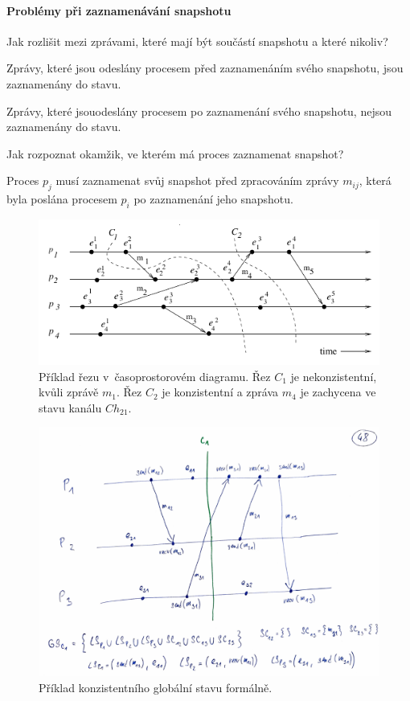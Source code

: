 \paragraph*{Problémy při zaznamenávání snapshotu} Jak rozlišit mezi zprávami, které mají být součástí snapshotu a které nikoliv?
\begin{compactitem}
    \item Zprávy, které jsou odeslány procesem před zaznamenáním svého  snapshotu, jsou zaznamenány do stavu.
    \item Zprávy, které jsouodeslány procesem po zaznamenání svého  snapshotu, nejsou zaznamenány do stavu.
\end{compactitem}

\noindent Jak rozpoznat okamžik, ve kterém má proces zaznamenat snapshot?
\begin{compactitem}
    \item Proces $p_j$ musí zaznamenat svůj snapshot před zpracováním zprávy $m_{ij}$, která byla poslána procesem $p_i$ po zaznamenání jeho snapshotu.
\end{compactitem}

\begin{figure}[H]
    \centering
    \includegraphics[width=1\linewidth]{example_cut.pdf}
    \caption{Příklad řezu v~časoprostorovém diagramu. Řez $C_1$ je nekonzistentní, kvůli zprávě $m_1$. Řez $C_2$ je konzistentní a zpráva $m_4$ je zachycena ve stavu kanálu $Ch_{21}$.}
    \label{48_example_cut}
\end{figure}


\begin{figure}[H]
    \centering
    \includegraphics[width=1\linewidth]{example_consistent_state.pdf}
    \caption{Příklad konzistentního globální stavu formálně.}
    \label{48_example_consistent_state}
\end{figure}
